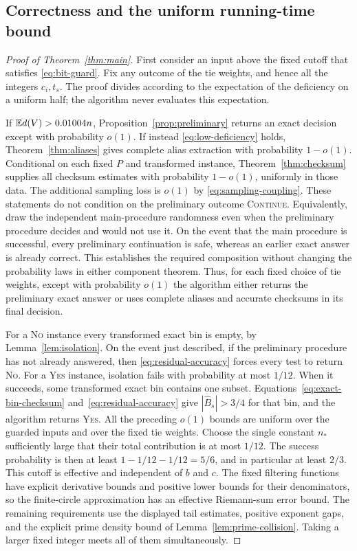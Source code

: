 \subsection{Correctness and the uniform running-time bound}

\begin{proof}[Proof of Theorem~\ref{thm:main}]
First consider an input above the fixed cutoff that satisfies
\eqref{eq:bit-guard}.  Fix any outcome of the tie weights, and hence all
the integers $c_i,t_s$.  The proof divides according to the expectation
of the deficiency on a uniform half; the algorithm never evaluates this
expectation.

If $\mathbb E d(V)>0.01004n$, Proposition~\ref{prop:preliminary} returns an
exact decision except with probability $o(1)$.  If instead
\eqref{eq:low-deficiency} holds, Theorem~\ref{thm:aliases} gives complete
alias extraction with probability $1-o(1)$.  Conditional on each fixed
$P$ and transformed instance, Theorem~\ref{thm:checksum} supplies all
checksum estimates with probability $1-o(1)$, uniformly in those data.
The additional sampling loss is $o(1)$ by
\eqref{eq:sampling-coupling}.  These statements do not condition on the
preliminary outcome \textsc{Continue}.  Equivalently, draw the independent
main-procedure randomness even when the preliminary procedure decides
and would not use it.  On the event that the main procedure is successful,
every preliminary continuation is safe, whereas an earlier exact answer
is already correct.  This establishes the required composition without
changing the probability laws in either component theorem.
Thus, for each fixed choice of tie weights, except with probability
$o(1)$ the algorithm either returns the preliminary exact answer or
uses complete aliases and accurate checksums in its final decision.

For a \textsc{No} instance every transformed exact bin is empty, by
Lemma~\ref{lem:isolation}.  On the event just described, if the
preliminary procedure has not already answered, then
\eqref{eq:residual-accuracy} forces every test to return
\textsc{No}.  For a \textsc{Yes} instance, isolation fails with probability
at most $1/12$.  When it succeeds, some transformed exact bin contains
one subset.  Equations~\eqref{eq:exact-bin-checksum}
and~\eqref{eq:residual-accuracy} give $|\widehat B_s|>3/4$ for that bin,
and the algorithm returns \textsc{Yes}.  All the preceding $o(1)$ bounds
are uniform over the guarded inputs and over the fixed tie weights.
Choose the single constant $n_*$ sufficiently large that their total
contribution is at most $1/12$.  The success probability is then at least
$1-1/12-1/12=5/6$, and in particular at least $2/3$.
This cutoff is effective and independent of $b$ and $c$.  The fixed
filtering functions have explicit derivative bounds and positive lower
bounds for their denominators, so the finite-circle approximation has an
effective Riemann-sum error bound.  The remaining requirements use the
displayed tail estimates, positive exponent gaps, and the explicit prime
density bound of Lemma~\ref{lem:prime-collision}.  Taking a larger fixed
integer meets all of them simultaneously.


\end{proof}
